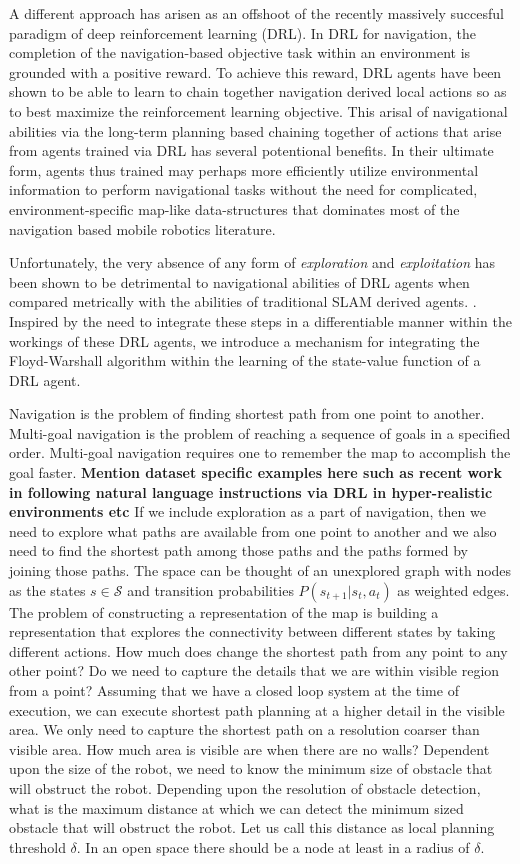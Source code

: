 \documentclass[letterpaper]{article} %
\def\state{s}
\newcommand{\state}[2]{\mathbf{s}^{#1}(#2)}
\newcommand{\st}{\state}
\newcommand{\St}{\mathcal{S}}
\newcommand{\lpt}{\delta}
\begin{document}
A different approach has arisen as an offshoot of the recently massively
succesful paradigm of deep reinforcement learning (DRL). In DRL for
navigation, the completion of the navigation-based objective task within
an environment is grounded with a positive reward. To achieve this
reward, DRL agents have been shown to be able to learn to chain together
navigation derived local actions so as to best maximize the
reinforcement learning objective.  This arisal of navigational abilities
via the long-term planning based chaining together of actions that arise
from agents trained via DRL has several potentional benefits. In their
ultimate form, agents thus trained may perhaps more efficiently utilize
environmental information to perform navigational tasks without the need
for complicated, environment-specific map-like data-structures that
dominates most of the navigation based mobile robotics literature.

Unfortunately, the very absence of any form of \emph{exploration} and
\emph{exploitation} has been shown to be detrimental to navigational
abilities of DRL agents when compared metrically with the abilities of
traditional SLAM derived agents.  \cite{dhiman2018critical}. Inspired by
the need to integrate these steps in a differentiable manner within the
workings of these DRL agents, we introduce a mechanism for integrating
the Floyd-Warshall algorithm within the learning of the state-value
function of a DRL agent. 


Navigation is the problem of finding shortest path from one point to another.
Multi-goal navigation is the problem of reaching a sequence of goals in a specified order.
Multi-goal navigation requires one to remember the map to accomplish the goal faster.
\textbf{Mention dataset specific examples here such as recent work in
following natural language instructions via DRL in hyper-realistic
environments etc}
If we include exploration as a part of navigation, then we need to explore what paths are
available from one point to another and we also need to find the shortest path among those
paths and the paths formed by joining those paths.
The space can be thought of an unexplored graph with nodes as the states $\st \in \St$ and
transition probabilities $P(\st_{t+1} | \st_t, a_t)$ as weighted edges.
The problem of constructing a representation of the map is building a representation that
explores the connectivity between different states by taking different actions.
How much does change the shortest path from any point to any other point?
Do we need to capture the details that we are within visible region from a point?
Assuming that we have a closed loop system at the time of execution, we can execute shortest
path planning at a higher detail in the visible area.
We only need to capture the shortest path on a resolution coarser than visible area.
How much area is visible are when there are no walls?
Dependent upon the size of the robot, we need to know the
minimum size of obstacle that will obstruct the robot.
Depending upon the resolution of obstacle detection, what is the maximum distance at which we
can detect the minimum sized obstacle that will obstruct the robot.
Let us call this distance as local planning threshold $\lpt$.
In an open space there should be a node at least in a radius of $\lpt$.
\end{document}
